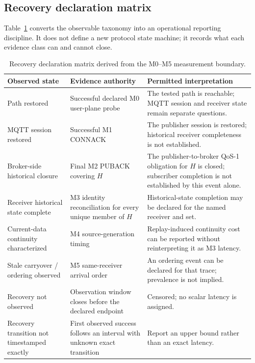 \documentclass[journal]{IEEEtran}
\begin{document}
\subsection{Recovery declaration matrix}

Table~\ref{tab:declaration} converts the observable taxonomy into an operational reporting discipline. It does not define a new protocol state machine; it records what each evidence class can and cannot close.

\begin{table}[t]
\centering
\small
\caption{Recovery declaration matrix derived from the M0--M5 measurement boundary.}
\label{tab:declaration}
\begin{tabular}{p{}p{}p{}}
\toprule
\textbf{Observed state} & \textbf{Evidence authority} & \textbf{Permitted interpretation} \\
\midrule
Path restored & Successful declared M0 user-plane probe & The tested path is reachable; MQTT session and receiver state remain separate questions. \\
MQTT session restored & Successful M1 CONNACK & The publisher session is restored; historical receiver completeness is not established. \\
Broker-side historical closure & Final M2 PUBACK covering $H$ & The publisher-to-broker QoS-1 obligation for $H$ is closed; subscriber completion is not established by this event alone. \\
Receiver historical state complete & M3 identity reconciliation for every unique member of $H$ & Historical-state completion may be declared for the named receiver and set. \\
Current-data continuity characterized & M4 source-generation timing & Replay-induced continuity cost can be reported without reinterpreting it as M3 latency. \\
Stale carryover / ordering observed & M5 same-receiver arrival order & An ordering event can be declared for that trace; prevalence is not implied. \\
Recovery not observed & Observation window closes before the declared endpoint & Censored; no scalar latency is assigned. \\
Recovery transition not timestamped exactly & First observed success follows an interval with unknown exact transition & Report an upper bound rather than an exact latency. \\
\bottomrule
\end{tabular}
\end{table}
\end{document}
